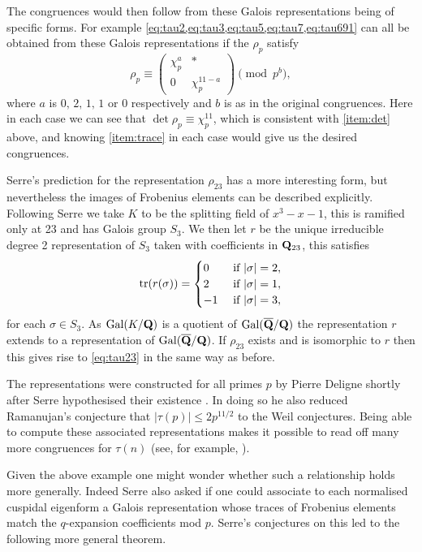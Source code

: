 \documentclass[a4paper,12pt]{article}
\begin{document}
\begin{ex}
The congruences would then follow from these Galois representations being of specific forms.
For example \cref{eq:tau2,eq:tau3,eq:tau5,eq:tau7,eq:tau691} can all be obtained from these Galois representations if the $\rho_p$ satisfy
\[
\rho_p \equiv \begin{pmatrix}
\chi_p^a & * \\
0        & \chi_p^{11-a}
\end{pmatrix}\pmod{p^b},
\]
where $a$ is $0,\,2,\,1,\,1$ or $0$ respectively and $b$ is as in the original congruences.
Here in each case we can see that $\det\rho_p \equiv \chi_p^{11}$, which is consistent with \cref{item:det} above, and knowing \cref{item:trace} in each case would give us the desired congruences.

Serre's prediction for the representation $\rho_{23}$ has a more interesting form, but nevertheless the images of Frobenius elements can be described explicitly.
Following Serre we take $K$ to be the splitting field of $x^3 - x - 1$, this is ramified only at 23 and has Galois group $S_3$.
We then let $r$ be the unique irreducible degree 2 representation of $S_3$ taken with coefficients in $\mathbf{Q}_{23}$, this satisfies
\[
\operatorname{tr}(r(\sigma)) = \begin{cases}
0 &\text{ if } |\sigma| = 2,\\
2 &\text{ if } |\sigma| = 1,\\
-1 &\text{ if } |\sigma| = 3,
\end{cases}
\]
for each $\sigma \in S_3$.
As $\operatorname{Gal}(K/\mathbf{Q})$ is a quotient of $\operatorname{Gal}(\overline{\mathbf{Q}}/\mathbf{Q})$ the representation $r$ extends to a representation of $\operatorname{Gal}(\overline{\mathbf{Q}}/\mathbf{Q})$.
If $\rho_{23}$ exists and is isomorphic to $r$ then this gives rise to \cref{eq:tau23} in the same way as before.

The representations were constructed for all primes $p$ by Pierre Deligne shortly after Serre hypothesised their existence \cite{Deligne}.
In doing so he also reduced Ramanujan's conjecture that $|\tau(p)| \le 2p^{11/2}$ to the Weil conjectures.
Being able to compute these associated representations makes it possible to read off many more congruences for $\tau(n)$ (see, for example, \cite{Mascot}).
\end{ex}

Given the above example one might wonder whether such a relationship holds more generally.
Indeed Serre also asked if one could associate to each normalised cuspidal eigenform a Galois representation whose traces of Frobenius elements match the $q$-expansion coefficients mod $p$.
Serre's conjectures on this led to the following more general theorem.
\end{document}
